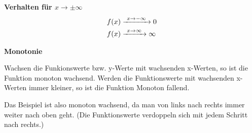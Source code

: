 \medskip

\begin{tcolorbox}
	\textbf{Verhalten für \(x\rightarrow \pm\infty\)}
	\textcolor{loestc}{
		\begin{align*}
			f(x)&\xrightarrow{\hphantom{\ }x\to-\infty\hphantom{\ }}0\\
			f(x)&\xrightarrow{\hphantom{\ }x\to\infty\hphantom{\ }}\infty
	\end{align*}}
    \vspace{1cm}
\end{tcolorbox}
\begin{tcolorbox}
	\textbf{Monotonie}

	\textcolor{loestc}{Wachsen die Funkionswerte bzw. y-Werte mit wachsenden x-Werten, so ist die Funktion monoton wachsend. Werden die Funktionswerte mit wachsenden x-Werten immer kleiner, so ist die Funktion Monoton fallend.}

	\textcolor{loestc}{Das Beispiel ist also monoton wachsend, da man von links nach rechts immer weiter nach oben geht. (Die Funktionswerte verdoppeln sich mit jedem Schritt nach rechts.)\vspace{3cm}}
\end{tcolorbox}
\newpage
